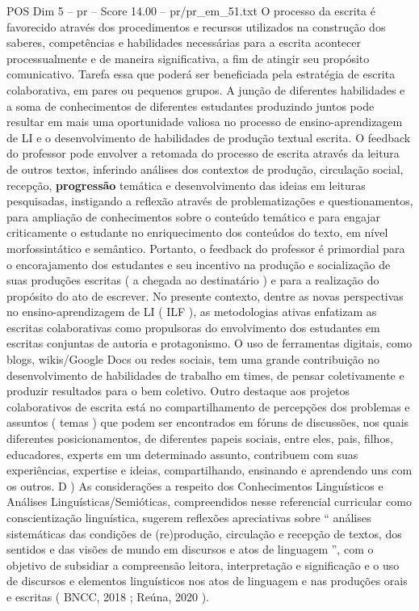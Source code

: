 \begin{textsample}{POS Dim 5 – pr – Score 14.00 – pr/pr\_em\_51.txt}
O processo da escrita é favorecido através dos procedimentos e recursos utilizados na construção dos saberes, competências e habilidades necessárias para a escrita acontecer processualmente e de maneira significativa, a fim de atingir seu propósito comunicativo.
Tarefa essa que poderá ser beneficiada pela estratégia de escrita colaborativa, em pares ou pequenos grupos.
A junção de diferentes habilidades e a soma de conhecimentos de diferentes estudantes produzindo juntos pode resultar em mais uma oportunidade valiosa no processo de ensino-aprendizagem de LI e o desenvolvimento de habilidades de produção textual escrita.
O feedback do professor pode envolver a retomada do processo de escrita através da leitura de outros textos, inferindo análises dos contextos de produção, circulação social, recepção, \textbf{progressão} temática e desenvolvimento das ideias em leituras pesquisadas, instigando a reflexão através de problematizações e questionamentos, para ampliação de conhecimentos sobre o conteúdo temático e para engajar criticamente o estudante no enriquecimento dos conteúdos do texto, em nível morfossintático e semântico.
Portanto, o feedback do professor é primordial para o encorajamento dos estudantes e seu incentivo na produção e socialização de suas produções escritas ( a chegada ao destinatário ) e para a realização do propósito do ato de escrever.
No presente contexto, dentre as novas perspectivas no ensino-aprendizagem de LI ( ILF ), as metodologias ativas enfatizam as escritas colaborativas como propulsoras do envolvimento dos estudantes em escritas conjuntas de autoria e protagonismo.
O uso de ferramentas digitais, como blogs, wikis/Google Docs ou redes sociais, tem uma grande contribuição no desenvolvimento de habilidades de trabalho em times, de pensar coletivamente e produzir resultados para o bem coletivo.
Outro destaque aos projetos colaborativos de escrita está no compartilhamento de percepções dos problemas e assuntos ( temas ) que podem ser encontrados em fóruns de discussões, nos quais diferentes posicionamentos, de diferentes papeis sociais, entre eles, pais, filhos, educadores, experts em um determinado assunto, contribuem com suas experiências, expertise e ideias, compartilhando, ensinando e aprendendo uns com os outros.
D ) As considerações a respeito dos Conhecimentos Linguísticos e Análises Linguísticas/Semióticas, compreendidos nesse referencial curricular como conscientização linguística, sugerem reflexões apreciativas sobre “ análises sistemáticas das condições de (re)produção, circulação e recepção de textos, dos sentidos e das visões de mundo em discursos e atos de linguagem ”, com o objetivo de subsidiar a compreensão leitora, interpretação e significação e o uso de discursos e elementos linguísticos nos atos de linguagem e nas produções orais e escritas ( BNCC, 2018 ; Reúna, 2020 ).

\end{textsample}
